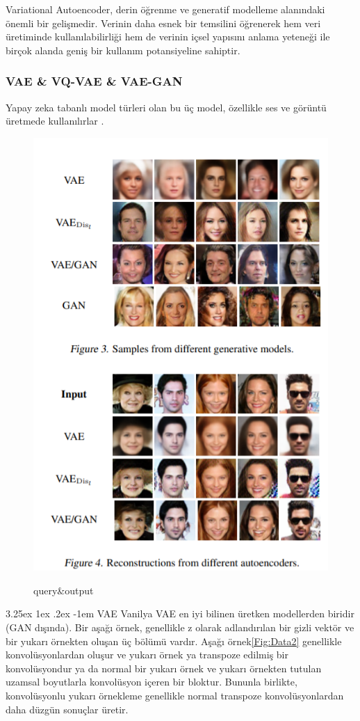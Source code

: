 \documentclass[12pt, a4paper]{article}
\makeatletter
\newcounter{subsubsubsection}[subsubsection]
\newcommand\subsubsubsection{\@startsection{subsubsubsection}{4}{\parindent}
	{3.25ex \@plus1ex \@minus .2ex}
	{-1em}
	{\normalfont\normalsize\bfseries}}
\makeatother
\begin{document}
			Variational Autoencoder, derin öğrenme ve generatif modelleme alanındaki önemli bir gelişmedir. Verinin daha esnek bir temsilini öğrenerek hem veri üretiminde kullanılabilirliği hem de verinin içsel yapısını anlama yeteneği ile birçok alanda geniş bir kullanım potansiyeline sahiptir.
			
			\clearpage
			\subsubsection{VAE \& VQ-VAE \& VAE-GAN}
			Yapay zeka tabanlı model türleri olan bu üç model, özellikle ses ve görüntü üretmede kullanılırlar \cite{vaeTypes}.
			\begin{figure}[!htb]
				\centering
				\includegraphics[width=.8\linewidth]{models.png}
				\caption{query\&output}\label{Fig:Data1}\cite{vaeTypes}
			\end{figure}
			\subsubsubsection{VAE}
			Vanilya VAE en iyi bilinen üretken modellerden biridir (GAN dışında). Bir aşağı örnek, genellikle z olarak adlandırılan bir gizli vektör ve bir yukarı örnekten oluşan üç bölümü vardır. Aşağı örnek\ref{Fig:Data2} genellikle konvolüsyonlardan oluşur ve yukarı örnek ya transpoze edilmiş bir konvolüsyondur ya da normal bir yukarı örnek ve yukarı örnekten tutulan uzamsal boyutlarla konvolüsyon içeren bir bloktur. Bununla birlikte, konvolüsyonlu yukarı örnekleme genellikle normal transpoze konvolüsyonlardan daha düzgün sonuçlar üretir.
\end{document}
